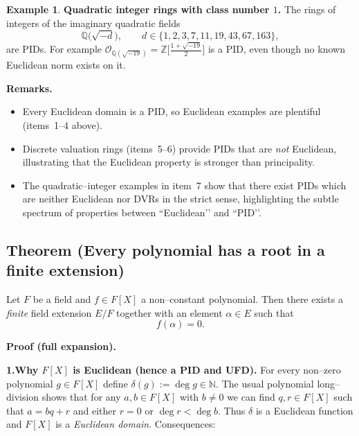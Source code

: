 \documentclass[12pt]{article}
\theoremstyle{definition} %
\newtheorem{example}{Example}
\theoremstyle{plain} %
\begin{document}
\begin{example}
  \item \textbf{Quadratic integer rings with class number \(1\).}  
        The rings of integers of the imaginary quadratic fields
        \[
           \mathbb{Q}\!\bigl(\sqrt{-d}\bigr),\qquad
           d\in\{1,2,3,7,11,19,43,67,163\},
        \]
        are PIDs.  
        For example
        \(
           \mathcal{O}_{\mathbb{Q}(\sqrt{-19})}=
           \mathbb{Z}\bigl[\tfrac{1+\sqrt{-19}}{2}\bigr]
        \)
        is a PID, even though no known Euclidean norm exists on it.
  
  \end{example}
  
  \bigskip
  \noindent
  \textbf{Remarks.}
  \begin{itemize}
  \item Every Euclidean domain is a PID, so Euclidean examples are
        plentiful (items~1–4 above).
  \item Discrete valuation rings (items~5–6) provide PIDs that are
        \emph{not} Euclidean, illustrating that the Euclidean property
        is stronger than principality.
  \item The quadratic–integer examples in item~7 show that there exist
        PIDs which are neither Euclidean nor DVRs in the strict sense,
        highlighting the subtle spectrum of properties between
        “Euclidean’’ and “PID’’.
  \end{itemize}
\subsection*{Theorem (Every polynomial has a root in a finite extension)}
Let \(F\) be a field and \(f\in F[X]\) a non–constant polynomial.
Then there exists a \emph{finite} field extension \(E/F\) together
with an element \(\alpha\in E\) such that
\[
     f(\alpha)=0.
\]

\bigskip
\textbf{Proof \;(full expansion).}

\medskip
\textbf{1.\;Why \(F[X]\) is Euclidean (hence a PID and UFD).}
For every non–zero polynomial \(g\in F[X]\) define
\(\delta(g):=\deg g\in\mathbb{N}\).
The usual polynomial long–division shows that for any
\(a,b\in F[X]\) with \(b\neq0\) we can find
\(q,r\in F[X]\) such that
\(a=bq+r\) and either \(r=0\) or \(\deg r<\deg b\).
Thus \(\delta\) is a Euclidean function and \(F[X]\) is a 
\emph{Euclidean domain}.
Consequences:
\end{document}
